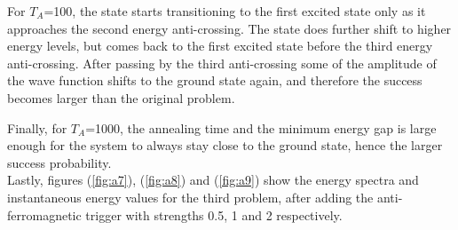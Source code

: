 \documentclass[12]{article}
\begin{document}
For $T_A$=100, the state starts transitioning to the first excited state only as it approaches the second energy anti-crossing. The state does further shift to higher energy levels, but comes back to the first excited state before the third energy anti-crossing. After passing by the third anti-crossing some of the amplitude of the wave function shifts to the ground state again, and therefore the success becomes larger than the original problem. 


Finally, for $T_A$=1000, the annealing time and the minimum energy gap is large enough for the system to always stay close to the ground state, hence the larger success probability.\\

Lastly, figures (\ref{fig:a7}), (\ref{fig:a8}) and (\ref{fig:a9}) show the energy spectra and instantaneous energy values for the third problem, after adding the anti-ferromagnetic trigger with strengths 0.5, 1 and 2 respectively. 
\end{document}
